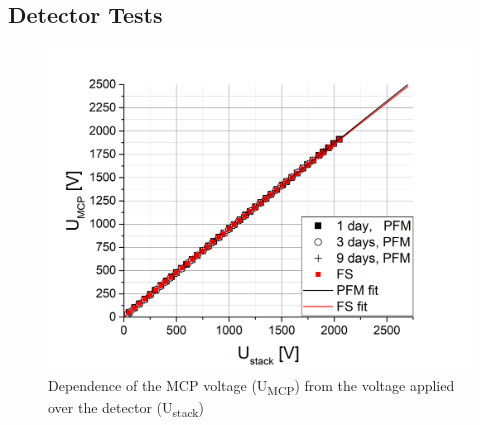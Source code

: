 	
	
	
	\subsection{Detector Tests}
	
	\begin{figure}[h]
		\centering
		\includegraphics[width=.7\textwidth]{Experiments/PFM_UstackUmccp_TimeEvol.png}
		\caption{Dependence of the MCP voltage (U\textsubscript{MCP}) from the voltage applied over the detector (U\textsubscript{stack})}
		\label{fig:PFMUstackUmcpTimeEvol}
	\end{figure}
	
